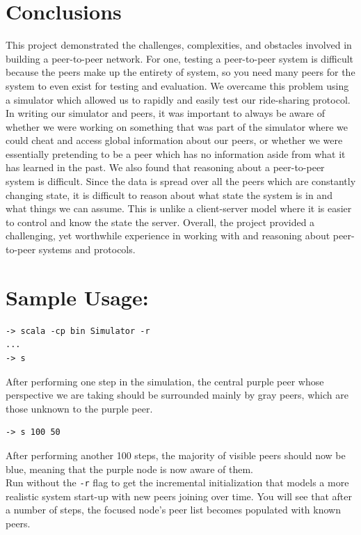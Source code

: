 \documentclass[letterpaper,11pt,twocolumn]{article}
\begin{document}
\section{Conclusions}
This project demonstrated the challenges, complexities, and obstacles involved in building a peer-to-peer network. For one, testing a peer-to-peer system is difficult because the peers make up the entirety of system, so you need many peers for the system to even exist for testing and evaluation. We overcame this problem using a simulator which allowed us to rapidly and easily test our ride-sharing protocol. In writing our simulator and peers, it was important to always be aware of whether we were working on something that was part of the simulator where we could cheat and access global information about our peers, or whether we were essentially pretending to be a peer which has no information aside from what it has learned in the past. We also found that reasoning about a peer-to-peer system is difficult. Since the data is spread over all the peers which are constantly changing state, it is difficult to reason about what state the system is in and what things we can assume. This is unlike a client-server model where it is easier to control and know the state the server. Overall, the project provided a challenging, yet worthwhile experience in working with and reasoning about peer-to-peer systems and protocols.

\appendix
\section{Sample Usage:}

\begin{verbatim}
-> scala -cp bin Simulator -r
...
-> s
\end{verbatim}

After performing one step in the simulation, the central purple peer whose perspective we are taking should be surrounded mainly by gray peers, which are those unknown to the purple peer.

\begin{verbatim}
-> s 100 50
\end{verbatim}

After performing another 100 steps, the majority of visible peers should now be blue, meaning that the purple node is now aware of them. \\

Run without the \texttt{-r} flag to get the incremental initialization that models a more realistic system start-up with new peers joining over time. You will see that after a number of steps, the focused node's peer list becomes populated with known peers.

%
%
\end{document}
